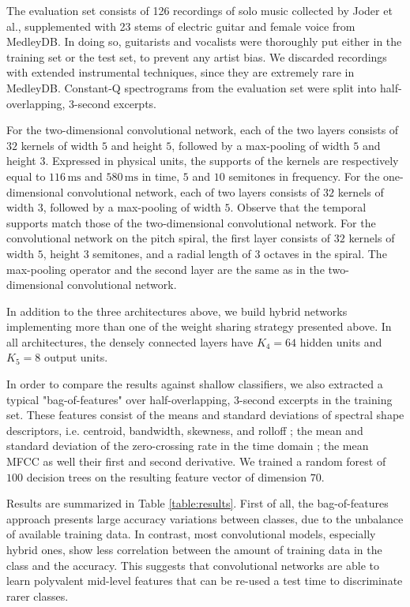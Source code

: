 \documentclass{article}
\makeatletter
\newcommand*{\ie}{i.e.\@\xspace}
\newcommand*{\etal}{et al.\@\xspace}
\makeatother
\begin{document}
The evaluation set consists of 126 recordings of solo music collected by
Joder \etal \cite{Joder2009}, supplemented with
23 stems of electric guitar and female voice from MedleyDB.
In doing so, guitarists and vocalists were thoroughly put either in the training set or the test set,
to prevent any artist bias.
We discarded recordings with extended instrumental techniques, since they are
extremely rare in MedleyDB.
Constant-Q spectrograms from the evaluation set were split into half-overlapping,
3-second excerpts.

For the two-dimensional convolutional network, each of the two layers consists of
$32$ kernels of width $5$ and height $5$, followed by a max-pooling of width $5$
and height $3$. Expressed in physical units, the supports of the kernels are respectively equal to $116\,\mathrm{ms}$ and $580\,\mathrm{ms}$ in time, $5$ and $10$ semitones in frequency.
For the one-dimensional convolutional network, each of two layers consists of
$32$ kernels of width $3$, followed by a max-pooling of width $5$. Observe that the temporal
supports match those of the two-dimensional convolutional network.
For the convolutional network on the pitch spiral, the first layer consists of $32$ kernels
of width $5$, height $3$ semitones, and a radial length of $3$ octaves in the spiral.
The max-pooling operator and the second layer are the same as in the two-dimensional convolutional network.

In addition to the three architectures above, we build hybrid networks implementing
more than one of the weight sharing strategy presented above.
In all architectures, the densely connected layers have $K_4=64$ hidden units
and $K_5=8$ output units.


In order to compare the results against shallow classifiers, we also extracted a typical
"bag-of-features" over half-overlapping, 3-second excerpts in the training set.
These features consist of the means and standard
deviations of spectral shape descriptors, \ie centroid, bandwidth, skewness,
and rolloff ; the mean and standard deviation of the zero-crossing rate in the time domain ;
the mean MFCC as well their first and second derivative.
We trained a random forest of $100$ decision trees on the resulting feature vector
of dimension $70$.

Results are summarized in Table \ref{table:results}.
First of all, the bag-of-features approach presents large accuracy variations
between classes, due to the unbalance of available training data.
In contrast, most convolutional models, especially hybrid ones, show less correlation
between the amount of training data in the class and the accuracy.
This suggests that convolutional networks are able to learn polyvalent
mid-level features that can be re-used a test time to discriminate rarer classes.
\end{document}
